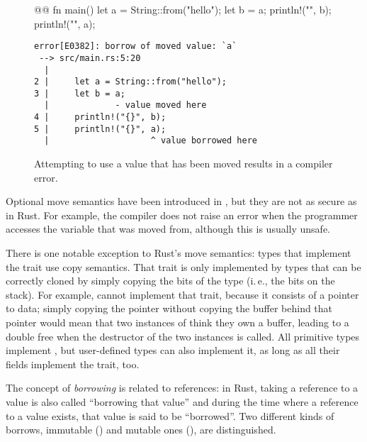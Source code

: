 {{\begin{figure}[t]
  \centering
  \begin{minipage}[t]{.5\textwidth}
    \begin{rustcode}
      @@
      fn main() {
          let a = String::from("hello");
          let b = a;
          println!("{}", b);
          println!("{}", a);
      }
    \end{rustcode}
  \end{minipage}
  \hspace{2mm}
  \begin{minipage}[t]{.47\textwidth}
    \footnotesize
    \vspace{1mm}
    \begin{verbatim}
error[E0382]: borrow of moved value: `a`
 --> src/main.rs:5:20
  |
2 |     let a = String::from("hello");
3 |     let b = a;
  |             - value moved here
4 |     println!("{}", b);
5 |     println!("{}", a);
  |                    ^ value borrowed here
    \end{verbatim}
  \end{minipage}
  \caption{Attempting to use a value that has been moved results in a compiler error.}
  \label{fig:string-move}
\end{figure}

Optional move semantics have been introduced in \cppeleven, but they are not as secure as in Rust.
For example, the \cpp compiler does not raise an error when the programmer accesses the variable that was moved from, although this is usually unsafe.

There is one notable exception to Rust's move semantics: types that implement the trait  use copy semantics.
That trait is only implemented by types that can be correctly cloned by simply copying the bits of the type (i.\,e., the bits on the stack).
For example,  cannot implement that trait, because it consists of a pointer to data; simply copying the pointer without copying the buffer behind that pointer would mean that two instances of  think they own a buffer, leading to a double free when the destructor of the two instances is called.
All primitive types implement , but user-defined types can also implement it, as long as all their fields implement the trait, too.

\vspace{8mm}

The concept of \emph{borrowing} is related to references:
in Rust, taking a reference to a value is also called \enquote{borrowing that value} and during the time where a reference to a value exists, that value is said to be \enquote{borrowed}.
Two different kinds of borrows, immutable () and mutable ones (), are distinguished.

}}
